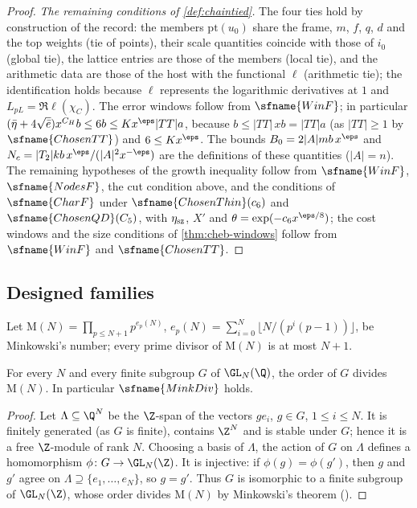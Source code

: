 \begin{proof}
\emph{The remaining conditions of \cref{def:chaintied}.} The four ties hold by construction of the record: the members
$\mathrm{pt}(u_0)$ share the frame, $m$, $f$, $q$, $d$ and the top weights (tie of points), their scale quantities coincide
with those of $i_0$ (global tie), the lattice entries are those of the members (local tie), and the arithmetic data
are those of the host with the functional $\ell$ (arithmetic tie); the identification holds because $\ell$ represents
the logarithmic derivatives at $1$ and $L_{pL}=\Re\ell(\chi_C)$. The error windows follow from $\sfname{WinF}$; in
particular $(\bar\eta+4\sqrt{\bar e})x^{C_H}b\le6b\le Kx^{\eps}|TT|a$, because $b\le|TT|\,xb=|TT|a$ (as $|TT|\ge1$ by
$\sfname{ChosenTT}$) and $6\le Kx^{\eps}$. The bounds $B_0=2|A|mb\,x^{\eps}$ and $N_c=|T_2|kb\,x^{\eps}/(|A|^2x^{-\eps})$
are the definitions of these quantities ($|A|=n$). The remaining hypotheses of the growth inequality follow from
$\sfname{WinF}$, $\sfname{NodesF}$, the cut condition above, and the conditions of $\sfname{CharF}$ under
$\sfname{ChosenThin}(c_6)$ and $\sfname{ChosenQD}(C_5)$, with $\eta_{\rm sz}$, $X'$ and $\theta=\exp(-c_6x^{\eps/8})$;
the cost windows and the size conditions of \cref{thm:cheb-windows} follow from $\sfname{WinF}$ and
$\sfname{ChosenTT}$.
\end{proof}

\subsection{Designed families}\label{sec:pf:top-shape:design}

Let $\mathrm M(N)=\prod_{p\le N+1}p^{e_p(N)}$, $e_p(N)=\sum_{i=0}^{N}\lfloor N/(p^i(p-1))\rfloor$, be Minkowski's
number; every prime divisor of $\mathrm M(N)$ is at most $N+1$.

\begin{lemma}\label{pf:top-shape:mink}
For every $N$ and every finite subgroup $G$ of $\GL_N(\Q)$, the order of $G$ divides $\mathrm M(N)$. In particular
$\sfname{MinkDiv}$ holds.
\end{lemma}

\begin{proof}
Let $\Lambda\subseteq\Q^N$ be the $\Z$-span of the vectors $ge_i$, $g\in G$, $1\le i\le N$. It is finitely generated
(as $G$ is finite), contains $\Z^N$ and is stable under $G$; hence it is a free $\Z$-module of rank $N$. Choosing a
basis of $\Lambda$, the action of $G$ on $\Lambda$ defines a homomorphism $\phi\colon G\to\GL_N(\Z)$. It is injective:
if $\phi(g)=\phi(g')$, then $g$ and $g'$ agree on $\Lambda\supseteq\{e_1,\dots,e_N\}$, so $g=g'$. Thus $G$ is
isomorphic to a finite subgroup of $\GL_N(\Z)$, whose order divides $\mathrm M(N)$ by Minkowski's theorem
\cite{Minkowski1887} ().
\end{proof}

